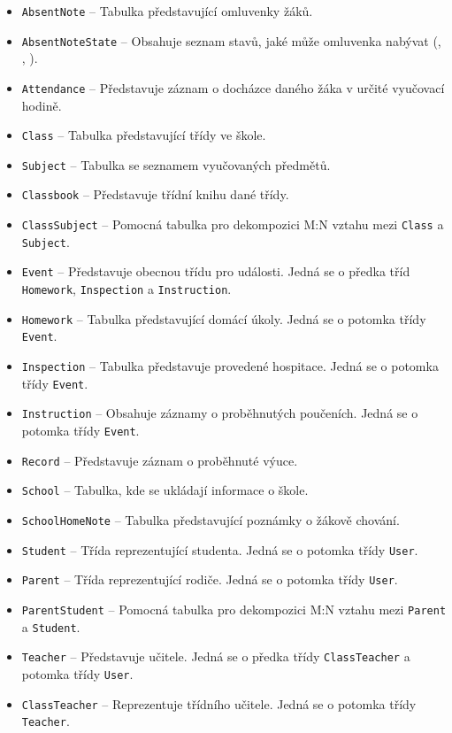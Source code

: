 \begin{itemize}
    \item \texttt{AbsentNote} -- Tabulka představující omluvenky žáků.
    \item \texttt{AbsentNoteState} -- Obsahuje seznam stavů, jaké může omluvenka nabývat (, , ).
    \item \texttt{Attendance} -- Představuje záznam o docházce daného žáka v určité vyučovací hodině.
    \item \texttt{Class} -- Tabulka představující třídy ve škole.
    \item \texttt{Subject} -- Tabulka se seznamem vyučovaných předmětů.
    \item \texttt{Classbook} -- Představuje třídní knihu dané třídy.
    \item \texttt{ClassSubject} -- Pomocná tabulka pro dekompozici M:N vztahu mezi \texttt{Class} a \texttt{Subject}.
    \item \texttt{Event} -- Představuje obecnou třídu pro události. Jedná se o předka tříd \texttt{Homework}, \texttt{Inspection} a \texttt{Instruction}.
    \item \texttt{Homework} -- Tabulka představující domácí úkoly. Jedná se o potomka třídy \texttt{Event}.
    \item \texttt{Inspection} -- Tabulka představuje provedené hospitace. Jedná se o potomka třídy \texttt{Event}.
    \item \texttt{Instruction} -- Obsahuje záznamy o proběhnutých poučeních. Jedná se o potomka třídy \texttt{Event}.
    \item \texttt{Record} -- Představuje záznam o proběhnuté výuce.
    \item \texttt{School} -- Tabulka, kde se ukládají informace o škole.
    \item \texttt{SchoolHomeNote} -- Tabulka představující poznámky o žákově chování.
    \item \texttt{Student} -- Třída reprezentující studenta. Jedná se o potomka třídy \texttt{User}.
    \item \texttt{Parent} -- Třída reprezentující rodiče. Jedná se o potomka třídy \texttt{User}.
    \item \texttt{ParentStudent} -- Pomocná tabulka pro dekompozici M:N vztahu mezi \texttt{Parent} a \texttt{Student}.
    \item \texttt{Teacher} -- Představuje učitele. Jedná se o předka třídy \texttt{ClassTeacher} a potomka třídy \texttt{User}.
    \item \texttt{ClassTeacher} -- Reprezentuje třídního učitele. Jedná se o potomka třídy \texttt{Teacher}.

\end{itemize}

